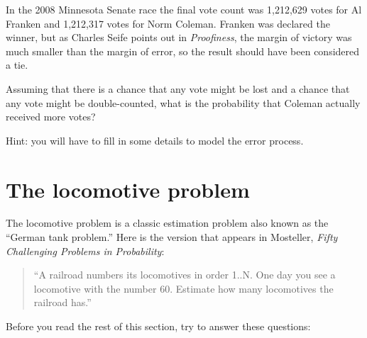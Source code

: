 \documentclass[12pt]{book}
\begin{document}
\begin{exercise}
In the 2008 Minnesota Senate race the final vote count was 1,212,629
votes for Al Franken and 1,212,317 votes for Norm Coleman.  Franken
was declared the winner, but as Charles Seife points out in {\it
  Proofiness}, the margin of victory was much smaller than the margin
of error, so the result should have been considered a tie.

Assuming that there is a chance that any vote might be lost and a chance
that any vote might be double-counted, what is the probability that
Coleman actually received more votes?

Hint: you will have to fill in some details to model the error process.

\end{exercise}


\section{The locomotive problem}

The locomotive problem is a classic estimation problem also
known as the ``German tank problem.''  Here is the version
that appears in Mosteller, {\it Fifty Challenging Problems in
  Probability}:

\begin{quote}
``A railroad numbers its locomotives in order 1..N.  One day you see a
locomotive with the number 60.  Estimate how many locomotives the
railroad has.''
\end{quote}

Before you read the rest of this section, try to answer these
questions:
\end{document}
